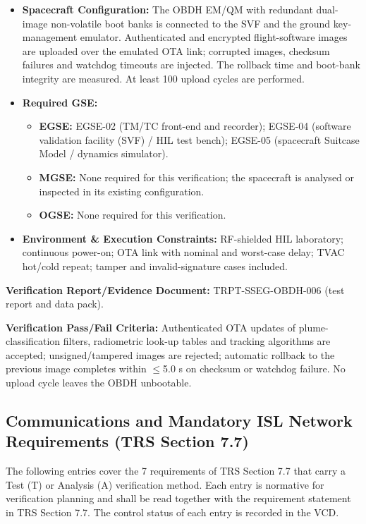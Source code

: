 \begin{itemize}
\item \textbf{Spacecraft Configuration:} The OBDH EM/QM with redundant dual-image non-volatile boot banks is connected to the SVF and the ground key-management emulator. Authenticated and encrypted flight-software images are uploaded over the emulated OTA link; corrupted images, checksum failures and watchdog timeouts are injected. The rollback time and boot-bank integrity are measured. At least 100 upload cycles are performed.
\item \textbf{Required GSE:}
\begin{itemize}
\item \textbf{EGSE:} EGSE-02 (TM/TC front-end and recorder); EGSE-04 (software validation facility (SVF) / HIL test bench); EGSE-05 (spacecraft Suitcase Model / dynamics simulator).
\item \textbf{MGSE:} None required for this verification; the spacecraft is analysed or inspected in its existing configuration.
\item \textbf{OGSE:} None required for this verification.
\end{itemize}
\item \textbf{Environment \& Execution Constraints:} RF-shielded HIL laboratory; continuous power-on; OTA link with nominal and worst-case delay; TVAC hot/cold repeat; tamper and invalid-signature cases included.
\end{itemize}
\par\textbf{Verification Report/Evidence Document:} TRPT-SSEG-OBDH-006 (test report and data pack).
\par\textbf{Verification Pass/Fail Criteria:} Authenticated OTA updates of plume-classification filters, radiometric look-up tables and tracking algorithms are accepted; unsigned/tampered images are rejected; automatic rollback to the previous image completes within $\le$5.0 s on checksum or watchdog failure. No upload cycle leaves the OBDH unbootable.
\par\medskip
\subsection{Communications and Mandatory ISL Network Requirements (TRS Section 7.7)}
The following entries cover the 7 requirements of TRS Section 7.7 that carry a Test (T) or Analysis (A) verification method. Each entry is normative for verification planning and shall be read together with the requirement statement in TRS Section 7.7. The control status of each entry is recorded in the VCD.
